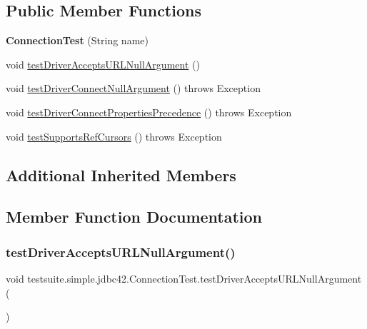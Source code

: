 \subsection*{Public Member Functions}
\begin{DoxyCompactItemize}
\item 
\mbox{\label{classtestsuite_1_1simple_1_1jdbc42_1_1_connection_test_ae280451f50bfa6c4c44f2c23755eaad8}} 
{\bfseries Connection\+Test} (String name)
\item 
void \mbox{\hyperlink{classtestsuite_1_1simple_1_1jdbc42_1_1_connection_test_a3cadb3b1e45f7d5ca7a941256427537f}{test\+Driver\+Accepts\+U\+R\+L\+Null\+Argument}} ()
\item 
void \mbox{\hyperlink{classtestsuite_1_1simple_1_1jdbc42_1_1_connection_test_a5919b756ab01d1c7005836699721ee8f}{test\+Driver\+Connect\+Null\+Argument}} ()  throws Exception 
\item 
void \mbox{\hyperlink{classtestsuite_1_1simple_1_1jdbc42_1_1_connection_test_a97dbec29a9c35d9c5cb8e79373da3867}{test\+Driver\+Connect\+Properties\+Precedence}} ()  throws Exception 
\item 
void \mbox{\hyperlink{classtestsuite_1_1simple_1_1jdbc42_1_1_connection_test_a428df5ce2ff1a22453a331c63e6802e5}{test\+Supports\+Ref\+Cursors}} ()  throws Exception 
\end{DoxyCompactItemize}
\subsection*{Additional Inherited Members}


\subsection{Member Function Documentation}
\mbox{\label{classtestsuite_1_1simple_1_1jdbc42_1_1_connection_test_a3cadb3b1e45f7d5ca7a941256427537f}} 
\subsubsection{\texorpdfstring{test\+Driver\+Accepts\+U\+R\+L\+Null\+Argument()}{testDriverAcceptsURLNullArgument()}}
{\footnotesize\ttfamily void testsuite.\+simple.\+jdbc42.\+Connection\+Test.\+test\+Driver\+Accepts\+U\+R\+L\+Null\+Argument (\begin{DoxyParamCaption}{ }\end{DoxyParamCaption})}

